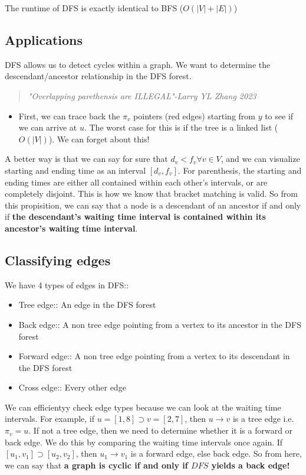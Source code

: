 \documentclass[12pt]{book}
\begin{document}
The runtime of DFS is exactly identical to BFS ($O(|V|+|E|)$)

\subsection*{Applications}

DFS allows us to detect cycles within a graph. We want to determine the descendant/ancestor relationship in the DFS forest.

\begin{quote}
    \textit{"Overlapping parethensis are ILLEGAL"-Larry YL Zhang 2023}
\end{quote}

\begin{itemize}
    \item First, we can trace back the $\pi_v$ pointers (red edges) starting from $y$ to see if we can arrive at $u$. The worst case for this is if the tree is a linked list ($O(|V|)$). We can forget about this!
\end{itemize}

A better way is that we can say for sure that $d_v<f_v\forall v\in V$, and we can visualize starting and ending time as an interval $[d_v,f_v]$. For parenthesis, the starting and ending times are either all contained within each other's intervals, or are completely disjoint. This is how we know that bracket matching is valid. So from this propisition, we can say that a node is a descendant of an ancestor if and only if \textbf{the descendant's waiting time interval is contained within its ancestor's waiting time interval}.

\subsection*{Classifying edges}

We have 4 types of edges in DFS::

\begin{itemize}
    \item Tree edge:: An edge in the DFS forest
    \item Back edge:: A non tree edge pointing from a vertex to its ancestor in the DFS forest
    \item Forward edge:: A non tree edge pointing from a vertex to its descendant in the DFS forest
    \item Cross edge:: Every other edge
\end{itemize}
We can efficientyy check edge types because we can look at the waiting time intervals. For example, if $u=[1,8]\supset v=[2,7]$, then $u\rightarrow v$ is a tree edge i.e. $\pi_v=u$. If not a tree edge, then we need to determine whether it is a forward or back edge. We do this by comparing the waiting time intervals once again. If $[u_1,v_1]\supset [u_2,v_2]$, then $u_1\rightarrow v_1$ is a forward edge, else back edge. So from here, we can say that \textbf{a graph is cyclic if and only if $DFS$ yields a back edge!}
\end{document}
